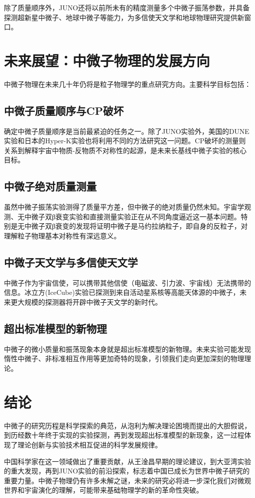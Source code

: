 \documentclass[12pt, a4paper]{article}
\begin{document}
除了质量顺序外，JUNO还将以前所未有的精度测量多个中微子振荡参数，并具备探测超新星中微子、地球中微子等能力，为多信使天文学和地球物理研究提供新窗口。

\section{未来展望：中微子物理的发展方向}
中微子物理在未来几十年仍将是粒子物理学的重点研究方向。主要科学目标包括：

\subsection{中微子质量顺序与CP破坏}
确定中微子质量顺序是当前最紧迫的任务之一。除了JUNO实验外，美国的DUNE实验和日本的Hyper-K实验也将利用不同的方法研究这一问题。CP破坏的测量则关系到解释宇宙中物质-反物质不对称性的起源，是未来长基线中微子实验的核心目标。

\subsection{中微子绝对质量测量}
虽然中微子振荡实验测得了质量平方差，但中微子的绝对质量仍然未知。宇宙学观测、无中微子双β衰变实验和直接测量实验正在从不同角度逼近这一基本问题。特别是无中微子双β衰变的发现将证明中微子是马约拉纳粒子，即自身的反粒子，对理解粒子物理基本对称性有深远意义。

\subsection{中微子天文学与多信使天文学}
中微子作为宇宙信使，可以携带其他信使（电磁波、引力波、宇宙线）无法携带的信息。冰立方(IceCube)实验已探测到来自活动星系核等高能天体源的中微子，未来更大规模的探测器将开辟中微子天文学的新时代。

\subsection{超出标准模型的新物理}
中微子的微小质量和振荡现象本身就是超出标准模型的新物理。未来实验可能发现惰性中微子、非标准相互作用等更加奇特的现象，引领我们走向更加深刻的物理理论。

\section{结论}
中微子的研究历程是科学探索的典范，从泡利为解决理论困境而提出的大胆假说，到历经数十年终于实现的实验探测，再到发现超出标准模型的新现象，这一过程体现了理论创新与实验技术相互促进的科学发展规律。

中国科学家在这一领域做出了重要贡献，从王淦昌早期的理论建议，到大亚湾实验的重大发现，再到JUNO实验的前沿探索，标志着中国已成长为世界中微子研究的重要力量。中微子物理仍有许多未解之谜，未来的研究必将进一步深化我们对微观世界和宇宙演化的理解，可能带来基础物理学的新的革命性突破。
\end{document}
